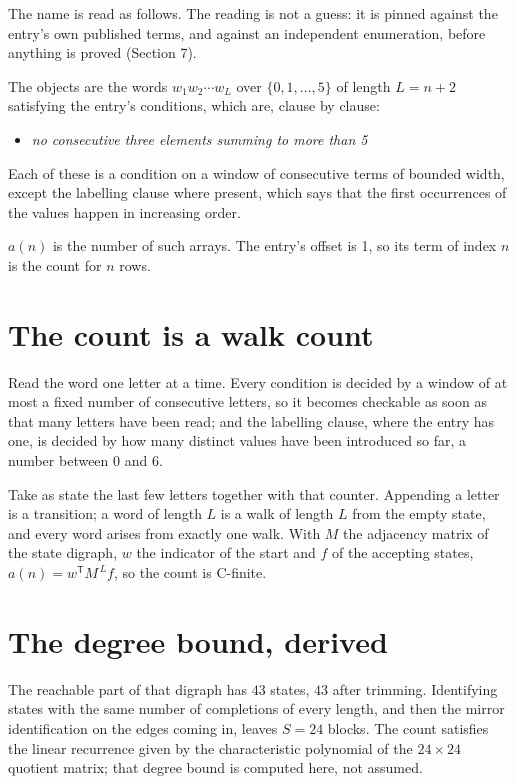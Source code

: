 \documentclass[11pt]{article}
\theoremstyle{definition}
\begin{document}
The name is read as follows. The reading is not a guess: it is pinned against the entry's own published terms, and against an independent enumeration, before anything is proved (Section 7).

The objects are the words $w_1 w_2 \cdots w_L$ over $\{0,1,\dots,5\}$ of length $L = n + 2$ satisfying the entry's conditions, which are, clause by clause:

\begin{itemize}

\item {\itshape no consecutive three elements summing to more than 5}

\end{itemize}

Each of these is a condition on a window of consecutive terms of bounded width, except the labelling clause where present, which says that the first occurrences of the values happen in increasing order.

$a(n)$ is the number of such arrays. The entry's offset is 1, so its term of index $n$ is the count for $n$ rows.

\section{The count is a walk count}

Read the word one letter at a time. Every condition is decided by a window of at most a fixed number of consecutive letters, so it becomes checkable as soon as that many letters have been read; and the labelling clause, where the entry has one, is decided by how many distinct values have been introduced so far, a number between $0$ and 6.

Take as state the last few letters together with that counter. Appending a letter is a transition; a word of length $L$ is a walk of length $L$ from the empty state, and every word arises from exactly one walk. With $M$ the adjacency matrix of the state digraph, $w$ the indicator of the start and $f$ of the accepting states, $a(n) = w^{\mathsf T}M^{\,L}f$, so the count is C-finite.

\section{The degree bound, derived}

The reachable part of that digraph has $43$ states, $43$ after trimming. Identifying states with the same number of completions of every length, and then the mirror identification on the edges coming in, leaves $S = 24$ blocks. The count satisfies the linear recurrence given by the characteristic polynomial of the $24\times24$ quotient matrix; that degree bound is computed here, not assumed.
\end{document}
